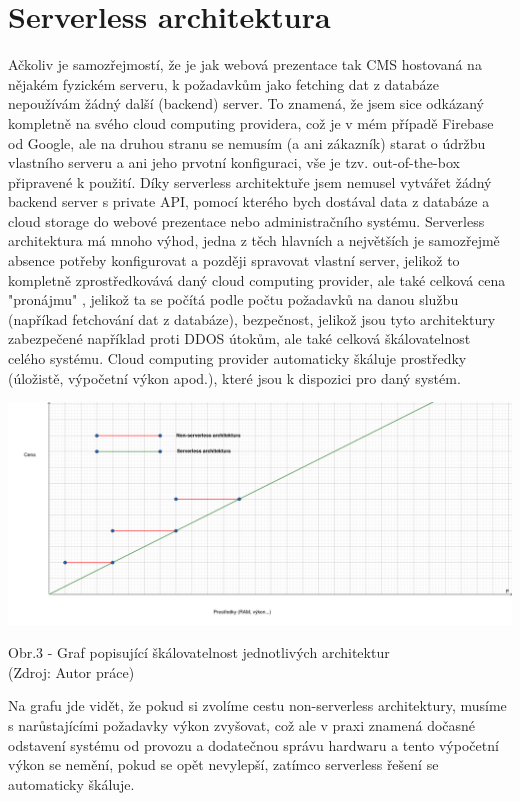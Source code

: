 \documentclass[12pt,a4paper]{report}
\begin{document}
  \section{Serverless architektura}
  Ačkoliv je samozřejmostí, že je jak webová prezentace tak CMS hostovaná na nějakém fyzickém
  serveru, k požadavkům jako fetching dat z databáze nepoužívám žádný další (backend) server. To
  znamená, že jsem sice odkázaný kompletně na svého cloud computing providera, což je v mém
  případě Firebase od Google, ale na druhou stranu se nemusím (a ani zákazník) starat o údržbu
  vlastního serveru a ani jeho prvotní konfiguraci, vše je tzv. out-of-the-box připravené k použití.
  Díky serverless architektuře jsem nemusel vytvářet žádný backend server s private API, pomocí
  kterého bych dostával data z databáze a cloud storage do webové prezentace nebo
  administračního systému.
  Serverless architektura má mnoho výhod, jedna z těch hlavních a největších je samozřejmě
  absence potřeby konfigurovat a později spravovat vlastní server, jelikož to kompletně
  zprostředkovává daný cloud computing provider, ale také celková cena "pronájmu" , jelikož ta se
  počítá podle počtu požadavků na danou službu (napříkad fetchování dat z databáze), bezpečnost,
  jelikož jsou tyto architektury zabezpečené například proti DDOS útokům, ale také celková
  škálovatelnost celého systému. Cloud computing provider automaticky škáluje prostředky (úložistě,
  výpočetní výkon apod.), které jsou k dispozici pro daný systém.

  \vspace*{0.5cm}
  \noindent\includegraphics[width=\linewidth]{non-vs-serverless.png}
  \begin{center}
    Obr.3 - Graf popisující škálovatelnost jednotlivých architektur  \\
    (Zdroj: Autor práce)
  \end{center}
  \vspace*{0.5cm}
  Na grafu jde vidět, že pokud si zvolíme cestu non-serverless architektury, musíme s narůstajícími
  požadavky výkon zvyšovat, což ale v praxi znamená dočasné odstavení systému od provozu a
  dodatečnou správu hardwaru a tento výpočetní výkon se nemění, pokud se opět nevylepší,
  zatímco serverless řešení se automaticky škáluje.
  
\end{document}
